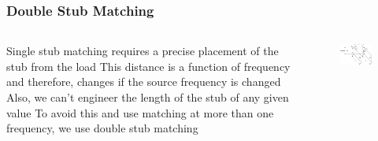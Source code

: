 \documentclass[10pt, compress]{beamer}
\begin{document}
\begin{frame}
    \frametitle{Double Stub Matching}
    \begin{columns}[]
        \begin{column}[]{.5\textwidth}
            \begin{outline}
                \1 Single stub matching requires a precise placement of the stub from the load
                \2 This distance is a function of frequency and therefore, changes if the source frequency is changed
                \2 Also, we can't engineer the length of the stub of any given value
                \1 To avoid this and use matching at more than one frequency, we use double stub matching
            \end{outline}  
        \end{column}
        \begin{column}[]{.5\textwidth}
            \begin{figure}[]
                \centering
                \includegraphics[width=.9\textwidth]{tline_double_stub.pdf}
            \end{figure}
        \end{column}
    \end{columns}
\end{frame}
\end{document}

